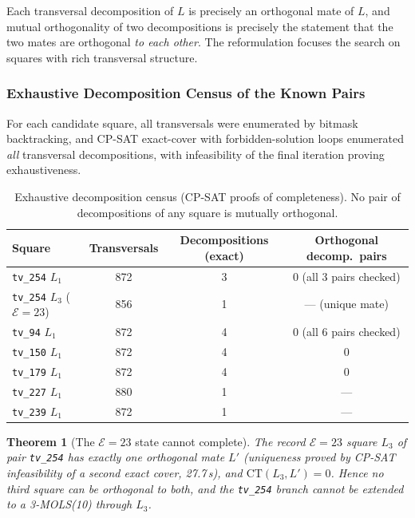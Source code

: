 \documentclass[11pt,a4paper]{article}
\newtheorem{theorem}{Theorem}[section]
\theoremstyle{remark}
\newcommand{\CT}{\mathrm{CT}}
\newcommand{\E}{\mathcal{E}}
\begin{document}
Each transversal decomposition of $L$ is precisely an orthogonal mate of $L$,
and mutual orthogonality of two decompositions is precisely the statement that
the two mates are orthogonal \emph{to each other}. The reformulation focuses the
search on squares with rich transversal structure.

\subsubsection{Exhaustive Decomposition Census of the Known Pairs}

For each candidate square, all transversals were enumerated by bitmask
backtracking, and CP-SAT exact-cover with forbidden-solution loops enumerated
\emph{all} transversal decompositions, with infeasibility of the final
iteration proving exhaustiveness.

\begin{table}[h]
\centering
\caption{Exhaustive decomposition census (CP-SAT proofs of completeness).
No pair of decompositions of any square is mutually orthogonal.}\label{tab:census}
\begin{tabular}{lccc}
\toprule
Square & Transversals & Decompositions (exact) & Orthogonal decomp.\ pairs\\
\midrule
\texttt{tv\_254} $L_1$ & 872 & 3 & 0 (all 3 pairs checked)\\
\texttt{tv\_254} $L_3$ ($\E{=}23$) & 856 & 1 & --- (unique mate)\\
\texttt{tv\_94} $L_1$ & 872 & 4 & 0 (all 6 pairs checked)\\
\texttt{tv\_150} $L_1$ & 872 & 4 & 0\\
\texttt{tv\_179} $L_1$ & 872 & 4 & 0\\
\texttt{tv\_227} $L_1$ & 880 & 1 & ---\\
\texttt{tv\_239} $L_1$ & 872 & 1 & ---\\
\bottomrule
\end{tabular}
\end{table}

\begin{theorem}[The $\E=23$ state cannot complete]\label{thm:e23mate}
The record $\E=23$ square $L_3$ of pair \texttt{tv\_254} has exactly one
orthogonal mate $L'$ (uniqueness proved by CP-SAT infeasibility of a second
exact cover, 27.7\,s), and $\CT(L_3, L') = 0$. Hence no third square can be
orthogonal to both, and the \texttt{tv\_254} branch cannot be extended to a
3-MOLS(10) through $L_3$.
\end{theorem}
\end{document}
